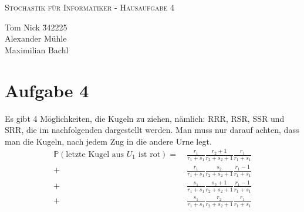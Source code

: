 \documentclass[10pt,a4paper,parskip=half]{scrartcl}
\begin{document}
\begin{center}
\textsc{\Large{Stochastik für Informatiker - Hausaufgabe 4}} \\
\end{center}
\begin{tabbing}
Tom Nick \hspace{1.4cm}\= 342225\\
Alexander Mühle\\
Maximilian Bachl
\end{tabbing}
\section*{Aufgabe 4}
Es gibt 4 Möglichkeiten, die Kugeln zu ziehen, nämlich: RRR, RSR, SSR und SRR, die im nachfolgenden dargestellt werden. Man muss nur darauf achten, dass man die Kugeln, nach jedem Zug in die andere Urne legt.
\begin{align*} 
\mathbb P(\text{letzte Kugel aus $U_1$ ist rot}) =&~ \frac{r_1}{r_1+s_1}\frac{r_2 + 1}{r_2+s_2 + 1}\frac{r_1}{r_1+s_1}\\
+&~ \frac{r_1}{r_1+s_1}\frac{s_2}{r_2+s_2 + 1}\frac{r_1-1}{r_1+s_1}\\
+&~ \frac{s_1}{r_1+s_1}\frac{s_2+1}{r_2+s_2 + 1}\frac{r_1-1}{r_1+s_1}\\
+&~ \frac{s_1}{r_1+s_1}\frac{r_2}{r_2+s_2 + 1}\frac{r_1}{r_1+s_1}
\end{align*}
\end{document}
